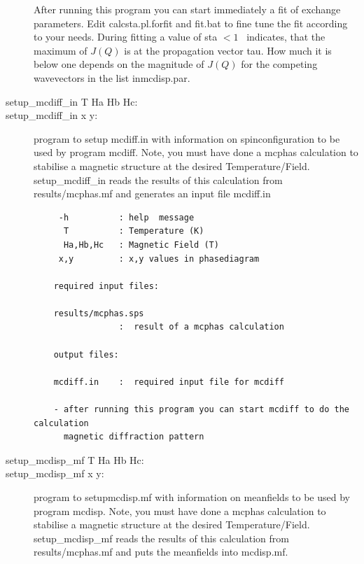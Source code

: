 \begin{description}
 After running this program you can start immediately a fit of exchange
    parameters. Edit {\prg calcsta.pl.forfit} and {\prg fit.bat} to fine tune the fit 
    according to your needs.
    During fitting a value of sta $< 1$~ indicates, that the maximum of $J(Q)$ is
    at the propagation vector tau. How much it is below one depends on the
    magnitude of $J(Q)$ for the competing wavevectors in the list in{\prg  mcdisp.par}.

\item [\prg setup\_mcdiff\_in\index{setup\_mcdiff\_in}  T Ha Hb Hc:] 
\item [\prg setup\_mcdiff\_in\index{setup\_mcdiff\_in}  x y:] 
program
 to setup {\prg mcdiff.in} with information on spinconfiguration
                    to be used by program {\prg mcdiff}. Note, you must
                    have done a {\prg mcphas} calculation to stabilise
                    a magnetic structure at the desired Temperature/Field.
                  { \prg   setup\_mcdiff\_in} reads the results of this calculation
                    from {\prg results/mcphas.mf} and generates an input file
                    {\prg mcdiff.in}

\begin{verbatim}
     -h          : help  message
      T          : Temperature (K)
      Ha,Hb,Hc   : Magnetic Field (T)
     x,y         : x,y values in phasediagram

    required input files:

    results/mcphas.sps
                 :  result of a mcphas calculation

    output files:

    mcdiff.in    :  required input file for mcdiff

    - after running this program you can start mcdiff to do the calculation
      magnetic diffraction pattern
\end{verbatim}
\item [ \prg   setup\_mcdisp\_mf \index{setup\_mcdisp\_mf} T Ha Hb Hc:] 
\item [ \prg   setup\_mcdisp\_mf \index{setup\_mcdisp\_mf} x y:] 

program to setup{\prg mcdisp.mf} with information on meanfields
                    to be used by program {\prg mcdisp}. Note, you must
                    have done a {\prg mcphas} calculation to stabilise
                    a magnetic structure at the desired Temperature/Field.
                    {\prg   setup\_mcdisp\_mf} reads the results of this calculation
                    from {\prg  results/mcphas.mf} and puts the meanfields into
                    {\prg mcdisp.mf}.



\end{description}
